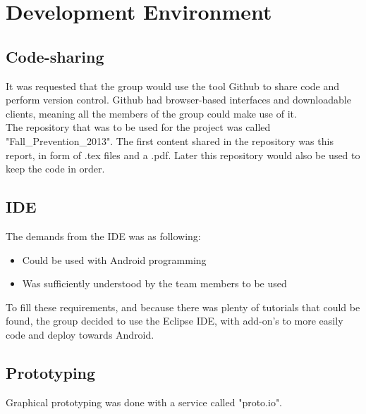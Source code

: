 \chapter{Development Environment}

\section{Code-sharing}
It was requested that the group would use the tool Github to share code and perform version control. Github had browser-based interfaces and downloadable clients, meaning all the members of the group could make use of it. \\
The repository that was to be used for the project was called "Fall\_Prevention\_2013". The first content shared in the repository was this report, in form of .tex files and a .pdf. Later this repository would also be used to keep the code in order. 

\section{IDE}
The demands from the IDE was as following:
\begin{itemize}
\item Could be used with Android programming
\item Was sufficiently understood by the team members to be used
\end{itemize}
To fill these requirements, and because there was plenty of tutorials that could be found, the group decided to use the Eclipse IDE, with add-on's to more easily code and deploy towards Android. 

\section{Prototyping}
Graphical prototyping was done with a service called "proto.io".